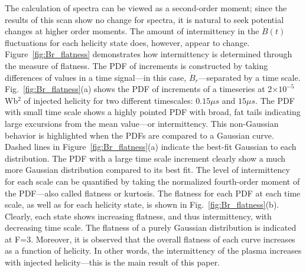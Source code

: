 \documentclass[aps,prl,amsmath,amssymb,reprint,superscriptaddress]{revtex4-1} %
\begin{document}
The calculation of spectra can be viewed as a second-order moment; since the results of this scan show no change for spectra, it is natural to seek potential changes at higher order moments. The amount of intermittency in the $\dot{B}(t)$ fluctuations for each helicity state does, however, appear to change. Figure~\ref{fig:Br_flatness} demonstrates how intermittency is determined through the measure of flatness. The PDF of increments is constructed by taking differences of values in a time signal---in this case, $\dot{B}_{r}$---separated by a time scale. Fig.~\ref{fig:Br_flatness}(a) shows the PDF of increments of a timeseries at 2$\times 10^{-5}$ Wb$^{2}$ of injected helicity for two different timescales: $0.15\mu s$ and $15\mu s$.  The PDF with small time scale shows a highly pointed PDF with broad, fat tails indicating large excursions from the mean value---or intermittency. This non-Gaussian behavior is highlighted when the PDFs are compared to a Gaussian curve. Dashed lines in Figure~\ref{fig:Br_flatness}(a) indicate the best-fit Gaussian to each distribution. The PDF with a large time scale increment clearly show a much more Gaussian distribution compared to its best fit. The level of intermittency for each scale can be quantified by taking the normalized fourth-order moment of the PDF---also called flatness or kurtosis. The flatness for each PDF at each time scale, as well as for each helicity state, is shown in Fig.~\ref{fig:Br_flatness}(b). Clearly, each state shows increasing flatness, and thus intermittency, with decreasing time scale. The flatness of a purely Gaussian distribution is indicated at F=3. Moreover, it is observed that the overall flatness of each curve increases as a function of helicity. In other words, the intermittency of the plasma increases with injected helicity---this is the main result of this paper.
\end{document}
